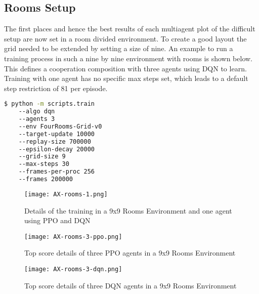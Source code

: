 \subsection{Rooms Setup}
The first places and hence the best results of each multiagent plot of the difficult setup are now set in a room divided environment. To create a good layout the grid needed to be extended by setting a size of nine. An example to run a training process in such a nine by nine environment with rooms is shown below. This defines a cooperation composition with three agents using DQN to learn. Training with one agent has no specific max steps set, which leads to a default step restriction of 81 per episode.

\begin{lstlisting}[float=htp,caption=Exemplary command to execute training with three DQN agents in a rooms setup,label=lst:rooms_command,language=bash ,xleftmargin=3ex,xrightmargin=1ex]
$ python -m scripts.train 
    --algo dqn 
    --agents 3
    --env FourRooms-Grid-v0
    --target-update 10000
    --replay-size 700000
    --epsilon-decay 20000
    --grid-size 9
    --max-steps 30
    --frames-per-proc 256
    --frames 200000
\end{lstlisting}

\newpage
\vfill
\begin{figure}
    \centering
    \texttt{[image: AX-rooms-1.png]}\\
    \caption[PPO and DQN Details of One Agent in a 9x9 Rooms Environment]{Details of the training in a 9x9 Rooms Environment and one agent using PPO and DQN}\label{fig:ax-rooms-1}
\end{figure}
\vfill
\clearpage


\newpage
\vfill
\begin{figure}
    \centering
    \texttt{[image: AX-rooms-3-ppo.png]}\\
    \caption[Details of Top PPO Competitive Executions in a 9x9 Rooms Environment]{Top score details of three PPO agents in a 9x9 Rooms Environment}\label{fig:ax-rooms-3-ppo}
\end{figure}
\vfill
\clearpage


\newpage
\vfill
\begin{figure}
    \centering
    \texttt{[image: AX-rooms-3-dqn.png]}\\
    \caption[Details of Top DQN Competitive Executions in a 9x9 Rooms Environment]{Top score details of three DQN agents in a 9x9 Rooms Environment}\label{fig:ax-rooms-3-dqn}
\end{figure}
\vfill
\clearpage

